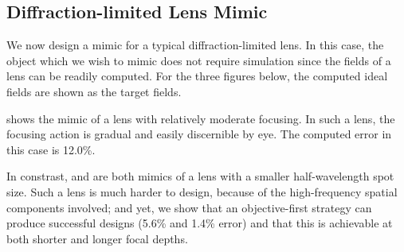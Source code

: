 \clearpage


\subsection{Diffraction-limited Lens Mimic}

We now design a mimic for a typical diffraction-limited lens.
In this case, the object which we wish to mimic does not require simulation
    since the fields of a lens can be readily computed.
For the three figures below, 
    the computed ideal fields are shown as the target fields.

 shows the mimic of a lens with relatively moderate focusing. 
In such a lens, the focusing action is gradual and easily discernible
    by eye.
The computed error in this case is 12.0\%.

In constrast,  and  are both mimics of
    a lens with a smaller half-wavelength spot size.
Such a lens is much harder to design, 
    because of the high-frequency spatial components involved;
    and yet, we show that an objective-first strategy can 
    produce successful designs (5.6\% and 1.4\% error)
    and that this is achievable at both shorter and longer focal depths.


\clearpage



